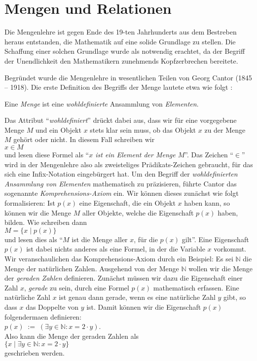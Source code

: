 \chapter{Mengen und Relationen}
Die Mengenlehre ist gegen Ende des 19-ten Jahrhunderts aus dem Bestreben heraus
entstanden, die Mathematik auf eine solide Grundlage zu stellen.  Die Schaffung einer
solchen Grundlage wurde als notwendig erachtet, da der Begriff der Unendlichkeit den
Mathematikern zunehmends Kopfzerbrechen bereitete.

Begr\"{u}ndet wurde die Mengenlehre in wesentlichen Teilen von Georg Cantor (1845 -- 1918).
Die erste Definition des Begriffs der Menge lautete etwa wie folgt \cite{cantor:1895}:
\begin{center}
Eine \emph{Menge} ist eine \emph{wohldefinierte} Ansammlung von \emph{Elementen}.
\end{center}
Das Attribut ``\emph{wohldefiniert}'' dr\"{u}ckt dabei aus, dass wir f\"{u}r 
eine vorgegebene Menge $M$ und ein Objekt $x$ stets klar sein muss, ob das Objekt $x$
zu der Menge $M$ geh\"{o}rt oder nicht.  In diesem Fall schreiben wir \\[0.2cm]
\hspace*{1.3cm} $x \in M$ \\[0.2cm]
und lesen diese Formel als ``\emph{$x$ ist ein Element der Menge $M$}''.
Das Zeichen ``$\in$'' wird in der Mengenlehre also als zweisteliges Pr\"{a}dikats-Zeichen
gebraucht, f\"{u}r das sich eine Infix-Notation eingeb\"{u}rgert hat.
Um den Begriff der \emph{wohldefinierten Ansammlung von Elementen} mathematisch zu
pr\"{a}zisieren, f\"{u}hrte Cantor das sogenannte \emph{Komprehensions-Axiom} ein.
Wir k\"{o}nnen dieses zun\"{a}chst wie folgt formalisieren: Ist $p(x)$ eine Eigenschaft, die
ein Objekt $x$ haben kann, so k\"{o}nnen wir die Menge $M$ aller Objekte, welche die
Eigenschaft $p(x)$ haben, bilden.  Wie schreiben dann \\[0.2cm]
\hspace*{1.3cm} $M = \{ x \;|\; p(x) \}$ \\[0.2cm]
und lesen dies als ``$M$ ist die Menge aller $x$, f\"{u}r die $p(x)$ gilt''.
Eine Eigenschaft $p(x)$ ist dabei nichts anderes als eine Formel, in der die Variable $x$
vorkommt.
Wir veranschaulichen das Komprehensions-Axiom durch ein Beispiel:  Es sei $\mathbb{N}$
die Menge der nat\"{u}rlichen Zahlen. Ausgehend von der Menge $\mathbb{N}$  wollen wir die
Menge der \emph{geraden Zahlen} definieren. Zun\"{a}chst m\"{u}ssen wir dazu die Eigenschaft einer
Zahl $x$,
\emph{gerade} zu sein, durch eine Formel $p(x)$ mathematisch erfassen.  Eine nat\"{u}rliche Zahl $x$ ist
genau dann gerade, wenn es eine nat\"{u}rliche Zahl $y$ gibt, so dass $x$ das Doppelte von $y$
ist.  Damit k\"{o}nnen wir die Eigenschaft $p(x)$ folgenderma\3en
definieren: \\[0.2cm]
\hspace*{1.3cm} $p(x) \;:=\; (\exists y\in \mathbb{N}: x = 2 \cdot y)$. \\[0.2cm]
Also kann die Menge der geraden Zahlen als \\[0.2cm]
\hspace*{1.3cm} $\{ x \;|\; \exists y\in \mathbb{N}: x = 2 \cdot y \}$ \\[0.2cm]
geschrieben werden.

